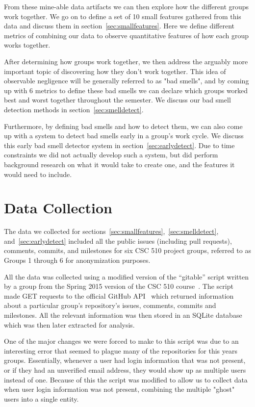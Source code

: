 \documentclass{acm_proc_article-sp}
\begin{document}
From these mine-able data artifacts we can then explore how the different groups work together. We go on to define a set of 10 small features gathered from this data and discuss them in section~\ref{sec:smallfeatures}. Here we define different metrics of combining our data to observe quantitative features of how each group works together.

After determining how groups work together, we then address the arguably more important topic of discovering how they don't work together. This idea of observable negligence will be generally referred to as "bad smells", and by coming up with 6 metrics to define these bad smells we can declare which groups worked best and worst together throughout the semester. We discuss our bad smell detection methods in section~\ref{sec:smelldetect}.

Furthermore, by defining bad smells and how to detect them, we can also come up with a system to detect bad smells early in a group's work cycle. We discuss this early bad smell detector system in section~\ref{sec:earlydetect}. Due to time constraints we did not actually develop such a system, but did perform background research on what it would take to create one, and the features it would need to include.

\section{Data Collection}\label{sec:datacollect}
The data we collected for sections~\ref{sec:smallfeatures},~\ref{sec:smelldetect}, and~\ref{sec:earlydetect} included all the public issues (including pull requests), comments, commits, and milestones for six CSC 510 project groups, referred to as Groups 1 through 6 for anonymization purposes.

All the data was collected using a modified version of the ``gitable'' script written by a group from the Spring 2015 version of the CSC 510 course~\cite{Axitron}. The script made GET requests to the official GitHub API~\cite{githubapi} which returned information about a particular group's repository's issues, comments, commits and milestones. All the relevant information was then stored in an SQLite database which was then later extracted for analysis. 

One of the major changes we were forced to make to this script was due to an interesting error that seemed to plague many of the repositories for this years groups. Essentially, whenever a user had login information that was not present, or if they had an unverified email address, they would show up as multiple users instead of one. Because of this the script was modified to allow us to collect data when user login information was not present, combining the multiple "ghost" users into a single entity.
\end{document}

